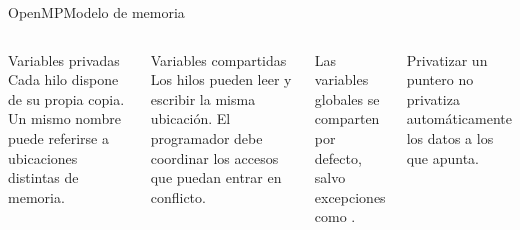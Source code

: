 \documentclass[aspectratio=169,10pt]{beamer}
\newcommand{\code}[1]{\texttt{\detokenize{#1}}}
\newcommand{\smallnote}[1]{\par{\scriptsize\color{muted}#1\par}}
\begin{document}
\begin{frame}{OpenMP}{Modelo de memoria}
\begin{columns}[c,onlytextwidth]
  \begin{block}{Variables privadas}
    Cada hilo dispone de su propia copia. Un mismo nombre puede referirse a ubicaciones distintas de memoria.
  \end{block}
  \begin{block}{Variables compartidas}
    Los hilos pueden leer y escribir la misma ubicación. El programador debe coordinar los accesos que puedan entrar en conflicto.
  \end{block}
  \small Las variables globales se comparten por defecto, salvo excepciones como \code{threadprivate}.
  \par\vspace{2mm}
  \smallnote{Privatizar un puntero no privatiza automáticamente los datos a los que apunta.}
  \centering
  \par
\end{columns}
\end{frame}
\end{document}
